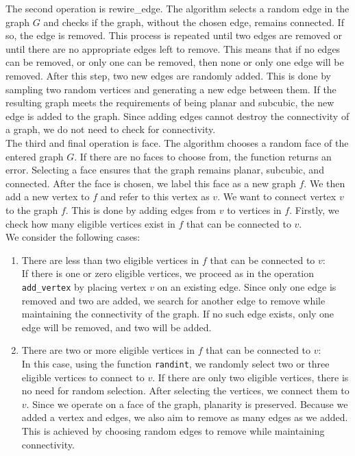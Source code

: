 \documentclass[12pt,a4paper]{amsart}
\theoremstyle{definition}
\theoremstyle{plain}
\begin{document}
The second operation is rewire\_edge. The algorithm selects a random edge in the graph $G$ and checks if the graph, 
without the chosen edge, remains connected. If so, the edge is removed. This process is repeated until two edges are removed 
or until there are no appropriate edges left to remove. This means that if no edges can be removed, or only one can be removed, 
then none or only one edge will be removed. After this step, two new edges are randomly added. This is done by sampling 
two random vertices and generating a new edge between them. If the resulting graph meets the requirements of being planar 
and subcubic, the new edge is added to the graph. Since adding edges cannot destroy the connectivity of a graph, we do not 
need to check for connectivity. \\

The third and final operation is face. The algorithm chooses a random face of the entered graph $G$. If there 
are no faces to choose from, the function returns an error. Selecting a face ensures that the graph remains planar, subcubic, 
and connected. After the face is chosen, we label this face as a new graph $f$. We then add a new vertex to $f$ and refer 
to this vertex as $v$. We want to connect vertex $v$ to the graph $f$. This is done by adding edges from $v$ to vertices 
in $f$. Firstly, we check how many eligible vertices exist in $f$ that can be connected to $v$.\\

We consider the following cases:

\begin{enumerate}
    \item There are less than two eligible vertices in $f$ that can be connected to $v$: \\
    If there is one or zero eligible vertices, we proceed as in the operation \texttt{add\_vertex} by placing vertex $v$ 
    on an existing edge. Since only one edge is removed and two are added, we search for another edge to remove while 
    maintaining the connectivity of the graph. If no such edge exists, only one edge will be removed, and two will be added.

    \item There are two or more eligible vertices in $f$ that can be connected to $v$:\\
    In this case, using the function \texttt{randint}, we randomly select two or three eligible vertices to connect to $v$. 
    If there are only two eligible vertices, there is no need for random selection. After selecting the vertices, we connect 
    them to $v$. Since we operate on a face of the graph, planarity is preserved. Because we added a vertex and edges, we 
    also aim to remove as many edges as we added. This is achieved by choosing random edges to remove while maintaining connectivity.
\end{enumerate}
\end{document}
